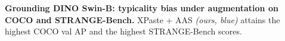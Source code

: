 \begin{table}[h]
\centering
\small
\caption{\textbf{Grounding DINO Swin-B: typicality bias under
augmentation on COCO and STRANGE-Bench.} XPaste + AAS \emph{(ours,
blue)} attains the highest COCO val AP and the highest
STRANGE-Bench scores.}
\label{tab:grounding_dino_main}
\vspace{-2pt}

\vspace{-3.0pt}
\end{table}
